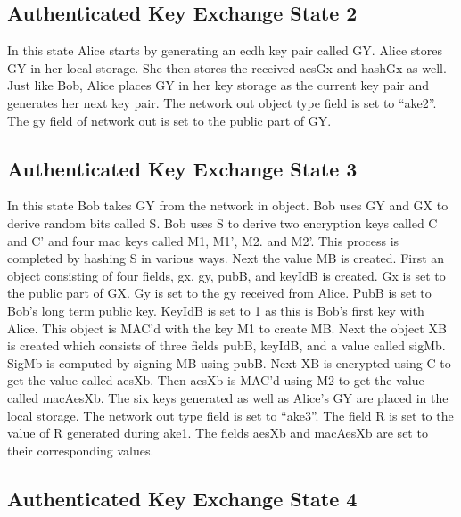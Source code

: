 \subsection{Authenticated Key Exchange State 2}


In this state Alice starts by generating an ecdh key pair called GY. Alice stores GY in her local storage. She then stores the received aesGx and hashGx as well. Just like Bob, Alice places GY in her key storage as the current key pair and generates her next key pair. The network out object type field is set to “ake2”. The gy field of network out is set to the public part of GY.


\subsection{Authenticated Key Exchange State 3}


In this state Bob takes GY from the network in object. Bob uses GY and GX to derive random bits called S. Bob uses S to derive two encryption keys called C and C’ and four mac keys called M1, M1’, M2. and M2’. This process is completed by hashing S in various ways. Next the value MB is created. First an object consisting of four fields, gx, gy, pubB, and keyIdB is created. Gx is set to the public part of GX. Gy is set to the gy received from Alice. PubB is set to Bob’s long term public key. KeyIdB is set to 1 as this is Bob’s first key with Alice. This object is MAC’d with the key M1 to create MB. Next the object XB is created which consists of three fields pubB, keyIdB, and a value called sigMb. SigMb is computed by signing MB using pubB. Next XB is encrypted using C to get the value called aesXb. Then aesXb is MAC’d using M2 to get the value called macAesXb. The six keys generated as well as Alice’s GY are placed in the local storage. The network out type field is set to “ake3”. The field R is set to the value of R generated during ake1. The fields aesXb and macAesXb are set to their corresponding values.


\subsection{Authenticated Key Exchange State 4}


